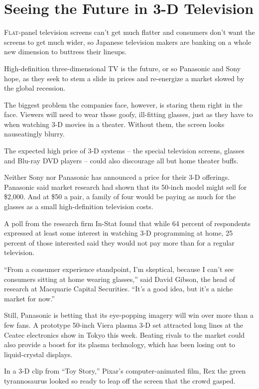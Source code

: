 ﻿\documentclass[12pt]{article}
\begin{document}
\section{Seeing the Future in 3-D Television}

\lettrine{F}{lat}-panel television screens can't get much flatter and
consumers don't want the screens to get much wider, so Japanese television makers are banking on a
whole new dimension to buttress their lineups.

High-definition three-dimensional TV is the future, or so Panasonic and Sony hope, as they seek to
stem a slide in prices and re-energize a market slowed by the global recession.

The biggest problem the companies face, however, is staring them right in the face. Viewers will
need to wear those goofy, ill-fitting glasses, just as they have to when watching 3-D movies in a
theater. Without them, the screen looks nauseatingly blurry.

The expected high price of 3-D systems -- the special television screens, glasses and Blu-ray DVD
players -- could also discourage all but home theater buffs.

Neither Sony nor Panasonic has announced a price for their 3-D offerings. Panasonic said market
research had shown that its 50-inch model might sell for \$2,000. And at \$50 a pair, a family of
four would be paying as much for the glasses as a small high-definition television costs.

A poll from the research firm In-Stat found that while 64 percent of respondents expressed at least
some interest in watching 3-D programming at home, 25 percent of those interested said they would
not pay more than for a regular television.

``From a consumer experience standpoint, I'm skeptical, because I can't see consumers sitting at
home wearing glasses,'' said David Gibson, the head of research at Macquarie Capital Securities.
``It's a good idea, but it's a niche market for now.''

Still, Panasonic is betting that its eye-popping imagery will win over more than a few fans. A
prototype 50-inch Viera plasma 3-D set attracted long lines at the Ceatec electronics show in Tokyo
this week. Beating rivals to the market could also provide a boost for its plasma technology, which
has been losing out to liquid-crystal displays.

In a 3-D clip from ``Toy Story,'' Pixar's computer-animated film, Rex the green tyrannosaurus looked
so ready to leap off the screen that the crowd gasped.
\end{document}

